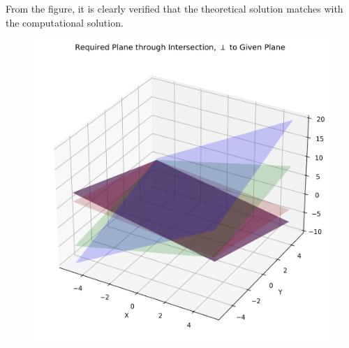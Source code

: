 \documentclass[journal]{IEEEtran}
\begin{document}
From the figure, it is clearly verified that the theoretical solution matches with the computational solution.\\
\begin{figure}[H]
    \centering
    \includegraphics[width=0.8\columnwidth]{figs/Figure_1.png}
    \label{fig:1}
\end{figure}
\end{document}
